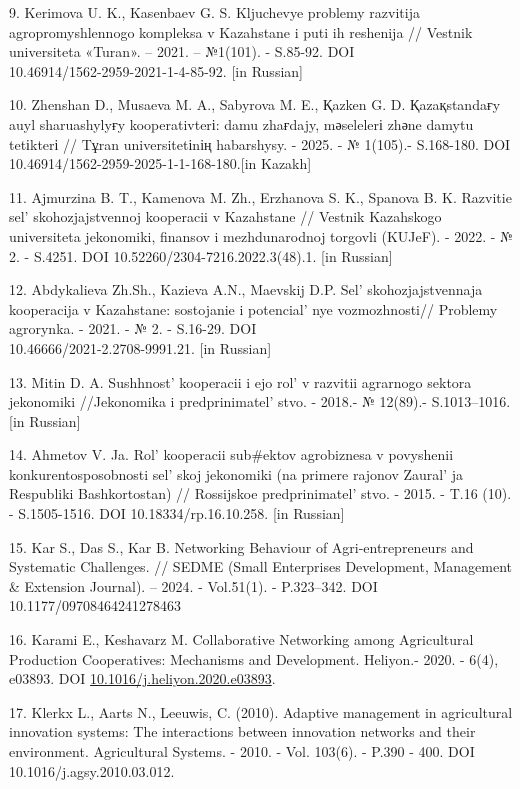 \begin{references}
9. Kerimova U. K., Kasenbaev G. S. Kljuchevye problemy razvitija
agropromyshlennogo kompleksa v Kazahstane i puti ih reshenija // Vestnik
universiteta «Turan». -- 2021. -- №1(101). - S.85-92. DOI\\
10.46914/1562-2959-2021-1-4-85-92. {[}in Russian{]}

10. Zhenshan D., Musaeva M. A., Sabyrova M. E., Қazken G. D.
Қazaқstandaғy auyl sharuashylyғy kooper\-ativterі: damu zhaғdajy,
mәselelerі zhәne damytu tetіkterі // Tұran universitetіnің habarshysy. -
2025. - № 1(105).- S.168-180. DOI
10.46914/1562-2959-2025-1-1-168-180.{[}in Kazakh{]}

11. Ajmurzina B. T., Kamenova M. Zh., Erzhanova S. K., Spanova B. K.
Razvitie sel' skohozjajstvennoj kooperacii v Kazahstane
// Vestnik Kazahskogo universiteta jekonomiki, finansov i mezhdunarodnoj
torg\-ovli (KUJeF). - 2022. - № 2. - S.4251. DOI
10.52260/2304-7216.2022.3(48).1. {[}in Russian{]}

12. Abdykalieva Zh.Sh., Kazieva A.N., Maevskij D.P.
Sel' skohozjajstvennaja kooperacija v
Kazahstane: sostojanie i potencial' nye vozmozhnosti//
Problemy agrorynka. - 2021. - № 2. - S.16-29. DOI\\
10.46666/2021-2.2708-9991.21. {[}in Russian{]}

13. Mitin D. A. Sushhnost'{} kooperacii i ejo
rol'{} v razvitii agrarnogo sektora jekonomiki
//Jekonomika i predprinimatel' stvo. - 2018.- № 12(89).-
S.1013--1016. {[}in Russian{]}

14. Ahmetov V. Ja. Rol'{} kooperacii sub\#ektov
agrobiznesa v povyshenii konkurentosposobnosti sel' skoj
jekonomiki (na primere rajonov Zaural' ja Respubliki
Bashkortostan) // Rossijskoe predprinimatel' stvo. -
2015. - T.16 (10). - S.1505-1516. DOI 10.18334/rp.16.10.258. {[}in
Russian{]}

15. Kar S., Das S., Kar B. Networking Behaviour of Agri-entrepreneurs
and Systematic Challenges. // SEDME (Small Enterprises Development,
Management \& Extension Journal). -- 2024. - Vol.51(1). - P.323--342.
DOI 10.1177/09708464241278463

16. Karami E., Keshavarz M. Collaborative Networking among Agricultural
Production Cooperatives: Mechanisms and Development. Heliyon.- 2020. -
6(4), e03893. DOI
\href{https://doi.org/10.1016/j.heliyon.2020.e03893}{10.1016/j.heliyon.2020.e03893}.

17. Klerkx L., Aarts N., Leeuwis, C. (2010). Adaptive management in
agricultural innovation systems: The interactions between innovation
networks and their environment. Agricultural Systems. - 2010. - Vol.
103(6). - P.390 - 400. DOI 10.1016/j.agsy.2010.03.012.
\end{references}


